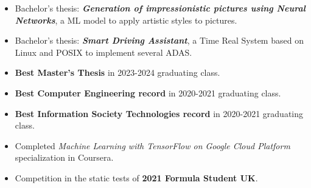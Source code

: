 \documentclass[10pt,a4paper,ragged2e,withhyper]{altacv}
\begin{document}
        
            \begin{itemize}
                \item Bachelor's thesis: \textit{\textbf{Generation of impressionistic pictures using Neural Networks}}, a ML model to apply artistic styles to pictures.
                \item Bachelor's thesis: \textit{\textbf{Smart Driving Assistant}}, a Time Real System based on Linux and POSIX to implement several ADAS.
            \end{itemize}
        \smallskip
    
        \begin{itemize}
            \item \textbf{Best Master's Thesis} in 2023-2024 graduating class.
            \item \textbf{Best Computer Engineering record} in 2020-2021 graduating class.
            \item \textbf{Best Information Society Technologies record} in 2020-2021 graduating class.
        \end{itemize}
    
    
        \begin{itemize}
            \item Completed \textit{Machine Learning with TensorFlow on Google Cloud Platform} specialization in Coursera.
            \item Competition in the static tests of \textbf{2021 Formula Student UK}.
        \end{itemize}
        
\end{document}
